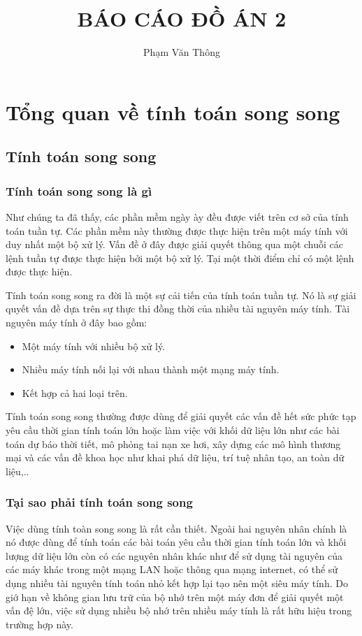 \documentclass{report}
\begin{document}
\title{BÁO CÁO ĐỒ ÁN 2}
\author{Phạm Văn Thông}

\maketitle
\chapter{Tổng quan về tính toán song song}
\section{Tính toán song song}
\subsection{Tính toán song song là gì}
Như chúng ta đã thấy, các phần mềm ngày ày đều được viết trên cơ sở của tính toán tuần tự. Các phần mềm này thường được thực hiện trên một máy tính với duy nhất một bộ xử lý. Vấn đề ở đây được giải quyết thông qua một chuỗi các lệnh tuần tự được thực hiện bởi một bộ xử lý. Tại một thời điểm chỉ có một lệnh được thực hiện.

Tính toán song song ra đời là một sự cải tiến của tính toán tuần tự. Nó là sự giải quyết vấn đề dựa trên sự thực thi đồng thời của nhiều tài nguyên máy tính. Tài nguyên máy tính ở đây bao gồm:
\begin{itemize}
\item Một máy tính với nhiều bộ xử lý.
\item Nhiều máy tính nối lại với nhau thành một mạng máy tính.
\item Kết hợp cả hai loại trên.
\end{itemize}

Tính toán song song thường được dùng để giải quyết các vấn đề hết sức phức tạp yêu cầu thời gian tính toán lớn hoặc làm việc với khối dữ liệu lớn như các bài toán dự báo thời tiết, mô phỏng tai nạn xe hơi, xây dựng các mô hình thương mại và các vấn đề khoa học như khai phá dữ liệu, trí tuệ nhân tạo, an toàn dữ liệu,..
\subsection{Tại sao phải tính toán song song}
Việc dùng tính toàn song song là rất cần thiết. Ngoài hai nguyên nhân chính là nó được dùng để tính toán các bài toán yêu cầu thời gian tính toán lớn và khối lượng dữ liệu lớn còn có các nguyên nhân khác như để sử dụng tài nguyên của các máy khác trong một mạng LAN hoặc thông qua mạng internet, có thể sử dụng nhiều tài nguyên tính toán nhỏ kết hợp lại tạo nên một siêu máy tính. Do giớ hạn về không gian lưu trữ của bộ nhớ trên một máy đơn để giải quyết một vấn đệ lớn, việc sử dụng nhiều bộ nhớ trên nhiều máy tính là rất hữu hiệu trong trường hợp này.
\end{document}
